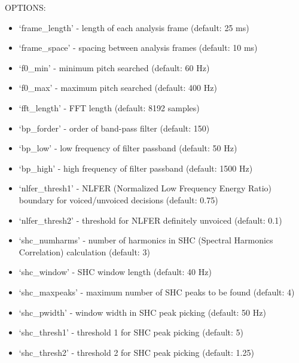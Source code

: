 \documentclass[letterpaper,10pt,english]{sphinxmanual}
\begin{document}
OPTIONS:
\begin{itemize}
\item {} 
`frame\_length' - length of each analysis frame (default: 25 ms)

\item {} 
`frame\_space' - spacing between analysis frames (default: 10 ms)

\item {} 
`f0\_min' - minimum pitch searched (default: 60 Hz)

\item {} 
`f0\_max' - maximum pitch searched (default: 400 Hz)

\item {} 
`fft\_length' - FFT length (default: 8192 samples)

\item {} 
`bp\_forder' - order of band-pass filter (default: 150)

\item {} 
`bp\_low' - low frequency of filter passband (default: 50 Hz)

\item {} 
`bp\_high' - high frequency of filter passband (default: 1500 Hz)

\item {} 
`nlfer\_thresh1' - NLFER (Normalized Low Frequency Energy Ratio) boundary for voiced/unvoiced decisions (default: 0.75)

\item {} 
`nlfer\_thresh2' - threshold for NLFER definitely unvoiced (default: 0.1)

\item {} 
`shc\_numharms' - number of harmonics in SHC (Spectral Harmonics Correlation) calculation (default: 3)

\item {} 
`shc\_window' - SHC window length (default: 40 Hz)

\item {} 
`shc\_maxpeaks' - maximum number of SHC peaks to be found (default: 4)

\item {} 
`shc\_pwidth' - window width in SHC peak picking (default: 50 Hz)

\item {} 
`shc\_thresh1' - threshold 1 for SHC peak picking (default: 5)

\item {} 
`shc\_thresh2' - threshold 2 for SHC peak picking (default: 1.25)


\end{itemize}
\end{document}
